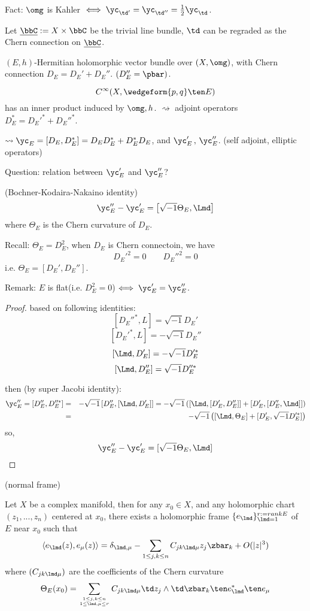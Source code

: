 Fact: $\omg$ is Kahler $\iff\yc_{\td'}=\yc_{\td''}=\frac{1}{2}\yc_\td$.

Let $\underline{\bbC}:=X\times\bbC$ be the trivial line bundle,
$\td$ can be regraded as the Chern connection on $\underline{\bbC}$.

$(E,h)$-Hermitian holomorphic vector bundle over $(X,\omg)$,
with Chern connection $D_E=D_E'+D_E''$. $(D_E''=\pbar)$.

$$C^\infty(X,\wedgeform{p,q}\ten E)$$
has an inner product induced by $\omg,h$.
$\rightsquigarrow$ adjoint operators $D_E^*=D_E'^*+D_E''^*$.

$\rightsquigarrow\yc_E=[D_E,D_E^*]=D_ED_E^*+D_E^*D_E$, and
$\yc_E'\,,\,\yc_E''$. (self adjoint, elliptic operators)

Question: relation between $\yc_E'$ and $\yc_E''$?

\begin{thm}(Bochner-Kodaira-Nakaino identity)
$$
  \yc_E''-\yc_E'
=
  \left[
    \sqrt{-1}
    \Theta_E
  ,
    \Lmd
  \right]
$$
where $\Theta_E$ is the Chern curvature of $D_E$.
\end{thm}

Recall: $\Theta_E=D_E^2$, when $D_E$ is Chern connectoin, we have
$$D_E'^2=0\qquad D_E''^2=0$$
i.e. $\Theta_E=[D_E',D_E'']$.

Remark: $E$ is flat(i.e. $D_E^2=0$)$\iff \yc_E'=\yc_E''$.

\begin{proof}
based on following identities:
$$[D_E''^*,L]=\sqrt{-1}D_E'$$
$$[D_E'^*,L]=-\sqrt{-1}D_E''$$
$$[\Lmd,D_E']=-\sqrt{-1}D_E'^*$$
$$[\Lmd,D_E'']=\sqrt{-1}D_E''^*$$

then (by super Jacobi identity):
\begin{eqnarray*}
  \yc_E''=[D_E'',D_E''^*]
&=&
  -\sqrt{-1}
  \left[
    D_E''
  ,
    [\Lmd,D_E']
  \right]
=
  -\sqrt{-1}
  \left(
    [\Lmd,[D_E',D_E'']]
   +[D_E',[D_E'',\Lmd]]
  \right)\\
&=&
  -\sqrt{-1}
  \left(
    [\Lmd,\Theta_E]
   +[D_E',\sqrt{-1}D_E'^*]
  \right)
\end{eqnarray*}
so,
$$\yc_E''-\yc_E'=[\sqrt{-1}\Theta_E,\Lmd]$$
\end{proof}

\begin{lemma}(normal frame)

Let $X$ be a complex manifold, then for any $x_0\in X$,
and any holomorphic chart $(z_1,...,z_n)$ centered at $x_0$,
there exists a holomorphic frame $\{e_\lmd\}_{\lmd=1}^{r:=rank E}$
of $E$ near $x_0$ such that
$$
  \left\langle
    e_{\lmd}(z),e_{\mu}(z)
  \right\rangle
=
  \delta_{\lmd,\mu}-
  \sum_{1\leq j,k \leq n}
  C_{jk\lmd\mu}
  z_j\zbar_k
+
 O(|z|^3)
$$
where $(C_{jk\lmd\mu})$ are the coefficients of the Chern curvature
$$\Theta_E(x_0)=
  \sum_{1\leq j,k\leq n\atop 1\leq\lmd,\mu\leq r}
    C_{jk\lmd\mu}
    \td z_j\wedge\td \zbar_{k}\ten e_\lmd^*\ten e_\mu
$$
\end{lemma}


